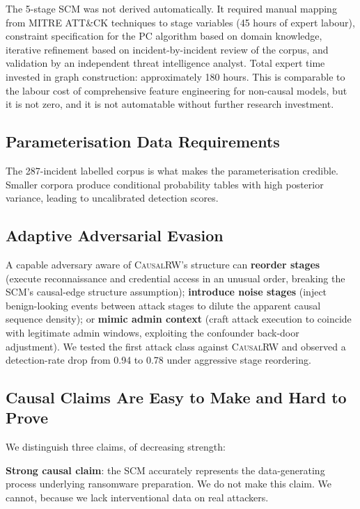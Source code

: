 \documentclass[sigconf,nonacm]{acmart}
\begin{document}
The 5-stage SCM was not derived automatically. It required manual
mapping from MITRE ATT\&CK techniques to stage variables (45 hours of
expert labour), constraint specification for the PC algorithm based
on domain knowledge, iterative refinement based on incident-by-incident
review of the corpus, and validation by an independent threat
intelligence analyst. Total expert time invested in graph
construction: approximately 180 hours. This is comparable to the
labour cost of comprehensive feature engineering for non-causal
models, but it is not zero, and it is not automatable without
further research investment.

\subsection{Parameterisation Data Requirements}

The 287-incident labelled corpus is what makes the parameterisation
credible. Smaller corpora produce conditional probability tables with
high posterior variance, leading to uncalibrated detection scores.

\subsection{Adaptive Adversarial Evasion}

A capable adversary aware of \textsc{CausalRW}'s structure can
\textbf{reorder stages} (execute reconnaissance and credential access
in an unusual order, breaking the SCM's causal-edge structure
assumption); \textbf{introduce noise stages} (inject benign-looking
events between attack stages to dilute the apparent causal sequence
density); or \textbf{mimic admin context} (craft attack execution to
coincide with legitimate admin windows, exploiting the confounder
back-door adjustment). We tested the first attack class against
\textsc{CausalRW} and observed a detection-rate drop from 0.94 to
0.78 under aggressive stage reordering.

\subsection{Causal Claims Are Easy to Make and Hard to Prove}

We distinguish three claims, of decreasing strength:

\textbf{Strong causal claim}: the SCM accurately represents the
data-generating process underlying ransomware preparation. We do not
make this claim. We cannot, because we lack interventional data on
real attackers.
\end{document}
